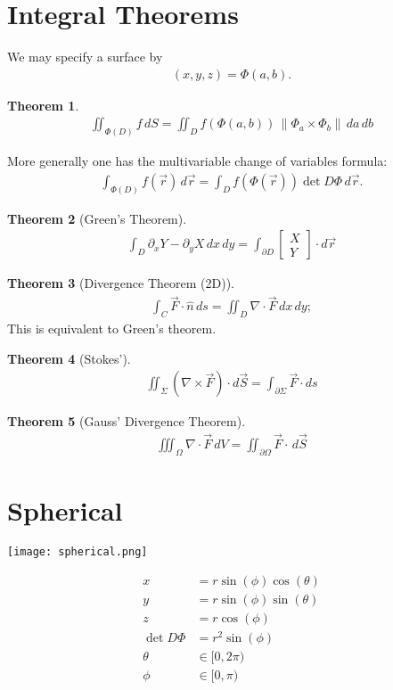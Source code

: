 \documentclass{article}
\theoremstyle{definition}
\newtheorem{thm}{Theorem}[subsubsection]
\begin{document}
\section{Integral Theorems}
We may specify a surface by
\begin{align*}
	(x,y,z)=\Phi(a,b).
\end{align*}
\begin{thm}
	\begin{align*}
		\iint_{\Phi(D)}f\,dS=\iint_Df(\Phi(a,b))\,\lVert\Phi_a\times\Phi_b\rVert\,da\,db
	\end{align*}
\end{thm}
More generally one has the multivariable change of variables formula:
\begin{align*}
	\int_{\Phi(D)}f(\vec r)\,d\vec r=\int_Df(\Phi(\vec r))\det D\Phi\,d\vec r.
\end{align*}
\begin{thm}[Green's Theorem]
	\begin{align*}
		\int_D\partial_xY-\partial_yX\,dx\,dy=\int_{\partial D}\begin{bmatrix}X\\Y\end{bmatrix}\cdot d\vec r
	\end{align*}
\end{thm}

\begin{thm}[Divergence Theorem (2D)]
	\begin{align*}
		\int_C\vec F\cdot\hat{n}\,ds=\iint_D\nabla\cdot\vec F\,dx\,dy;
	\end{align*}
	This is equivalent to Green's theorem.
\end{thm}
\begin{thm}[Stokes']
	\begin{align*}
		\iint_\Sigma(\nabla\times\vec F)\cdot d\vec S=\int_{\partial\Sigma}\vec F\cdot ds
	\end{align*}
\end{thm}
\begin{thm}[Gauss' Divergence Theorem]
	\begin{align*}
		\iiint_\Omega\nabla\cdot\vec F\,dV=\iint_{\partial\Omega}\vec F\cdot\,d\vec S
	\end{align*}
\end{thm}

\section{Spherical}
\begin{center}
	\texttt{[image: spherical.png]}
\end{center}
\begin{align*}
	x&=r\sin(\phi)\cos(\theta)\\
	y&=r\sin(\phi)\sin(\theta)\\
	z&=r\cos(\phi)\\
	\det D\Phi&=r^2\sin(\phi)\\
	\theta&\in[0,2\pi)\\
	\phi&\in[0,\pi)
\end{align*}
\end{document}
